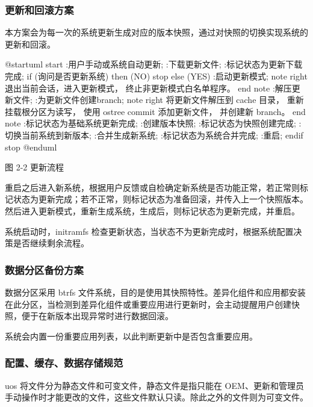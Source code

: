 \documentclass{utart}
\begin{document}
\subsubsection{更新和回滚方案}
本方案会为每一次的系统更新生成对应的版本快照，通过对快照的切换实现系统的更新和回滚。

\begin{center}
  \begin{adjustbox}{scale=0.55}
    \begin{plantuml}
      @startuml
      start
      :用户手动或系统自动更新;
      :下载更新文件;
      :标记状态为更新下载完成;
      if (询问是否更新系统) then (NO)
      stop
      else (YES)
      :启动更新模式;
      note right
      退出当前会话，进入更新模式，
      终止非更新模式白名单程序。
      end note
      :解压更新文件;
      :为更新文件创建branch;
      note right
      将更新文件解压到 cache 目录，
      重新挂载根分区为读写，
      使用 ostree commit 添加更新文件，
      并创建新 branch。
      end note
      :标记状态为基础系统更新完成;
      :创建版本快照;
      :标记状态为快照创建完成;
      :切换当前系统到新版本;
      :合并生成新系统;
      :标记状态为系统合并完成;
      :重启;
      endif
      stop
      @enduml
    \end{plantuml}
  \end{adjustbox}

  图 2-2 更新流程
\end{center}

重启之后进入新系统，根据用户反馈或自检确定新系统是否功能正常，若正常则标记状态为更新完成；若不正常，则标记状态为准备回滚，并传入上一个快照版本。
然后进入更新模式，重新生成系统，生成后，则标记状态为更新完成，并重启。

系统启动时，initramfs 检查更新状态，当状态不为更新完成时，根据系统配置决策是否继续剩余流程。

\subsubsection{数据分区备份方案}
数据分区采用 btrfs 文件系统，目的是使用其快照特性。差异化组件和应用都安装在此分区，当检测到差异化组件或重要应用进行更新时，会主动提醒用户创建快照，便于在新版本出现异常时进行数据回滚。

系统会内置一份重要应用列表，以此判断更新中是否包含重要应用。

\subsubsection{配置、缓存、数据存储规范}
uos 将文件分为静态文件和可变文件，静态文件是指只能在 OEM、更新和管理员手动操作时才能更改的文件，这些文件默认只读。除此之外的文件则为可变文件。
\end{document}
